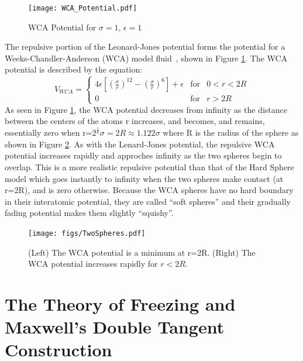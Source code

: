\documentclass[double,12pt]{beavtex}
\begin{document}
\begin{figure}[h!]
    \centering
    \texttt{[image: WCA\_Potential.pdf]}
    \caption{WCA Potential for $\sigma=1$, $\epsilon=1$}
    \label{fig:WCA_potential}
  \end{figure}

The repulsive portion of the Leonard-Jones potential forms the potential for a 
Weeks-Chandler-Anderson (WCA) model fluid~\cite{andersen1971relationship}, 
shown in Figure \ref{fig:WCA_potential}. 
The WCA potential is described by the equation: 
\begin{equation}{V_{WCA}=\left\{\begin{array}{rcl} {4\epsilon{\left[\left(\frac{\sigma}{r}\right)^{12} - \left(\frac{\sigma}{r}\right)^6 \right]}+\epsilon} & \mbox{for} & 0<r<{2R} \\ 0 & \mbox{for} & r>2R \end{array}\right.}\end{equation} 
As seen in Figure \ref{fig:WCA_potential}, the WCA potential decreases 
from infinity as the distance between the centers of the atoms r increases, 
and becomes, and remains, essentially zero when 
r=$2^\frac{1}{6}\sigma=2R\approx{1.122}\sigma$ 
where R is the radius of the sphere as shown in Figure \ref{fig:TwoSpheres}. 
As with the Lenard-Jones potential, the repulsive WCA potential increases 
rapidly and approches infinity as the two spheres begin to overlap. This 
is a more realistic repulsive potential than that of the Hard Sphere model 
which goes instantly to infinity when the two spheres make contact (at r=2R), 
and is zero otherwise. Because the WCA spheres have no hard boundary in 
their interatomic potential, they are called ``soft spheres'' and their 
gradually fading potential makes them slightly ``squishy''.

\begin{figure}[h!]
    \centering
    \texttt{[image: figs/TwoSpheres.pdf]} 
    \caption{(Left) The WCA potential is a minimum at r=2R. 
             (Right) The WCA potential increases rapidly for $r<2R$.}
    \label{fig:TwoSpheres}
    \end{figure} 
    
\newpage
\section{The Theory of Freezing and Maxwell's Double Tangent Construction}
\end{document}
